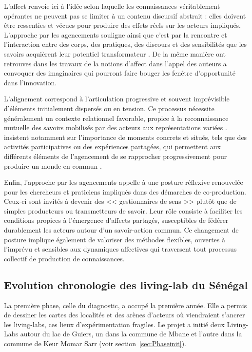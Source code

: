 \documentclass{article}
\begin{document}
L'affect renvoie ici à l'idée selon laquelle les connaissances véritablement opérantes ne peuvent pas se limiter à un contenu discursif abstrait : elles doivent être ressenties et vécues pour produire des effets réels sur les acteurs impliqués. L'approche par les agencements souligne ainsi que c'est par la rencontre et l'interaction entre des corps, des pratiques, des discours et des sensibilités que les savoirs acquièrent leur potentiel transformateur \parencite{bessy_experts_1995}. De la même manière ont retrouves dans les travaux de \textcite{jasanoff_constitutional_2011, beck_governance_2021} la notions d'affect dans l'appel des auteurs a convoquer des imaginaires qui pourront faire bouger les fenêtre d’opportunité dans l'innovation.

L'alignement correspond à l'articulation progressive et souvent imprévisible d'éléments initialement dispersés ou en tension. Ce processus nécessite généralement un contexte relationnel favorable, propice à la reconnaissance mutuelle des savoirs mobilisés par des acteurs aux représentations variées \parencite{geels_typology_2007}. \textcite{jasanoff_constitutional_2011, hertz_knowledge_2025} insistent notamment sur l'importance de moments concrets et situés, tels que des activités participatives ou des expériences partagées, qui permettent aux différents éléments de l'agencement de se rapprocher progressivement pour produire un monde en commun \parencite{arendt_condition_1957}.

Enfin, l'approche par les agencements appelle à une posture réflexive renouvelée pour les chercheurs et praticiens impliqués dans des démarches de co-production. Ceux-ci sont invités à devenir des << gestionnaires de sens >> plutôt que de simples producteurs ou transmetteurs de savoir. Leur rôle consiste à faciliter les conditions propices à l'émergence d'affects partagés, susceptibles de fédérer durablement les acteurs autour d'un savoir-action commun. Ce changement de posture implique également de valoriser des méthodes flexibles, ouvertes à l'imprévu et sensibles aux dynamiques affectives qui traversent tout processus collectif de production de connaissances.

\subsection{Evolution chronologie des living-lab du Sénégal}

La première phase, celle du diagnostic, a occupé la première année. Elle a permis de dessiner les cartes des localités et des arènes d’acteurs où viendraient s’ancrer les living-labs, ces lieux d’expérimentation fragiles. Le projet a initié deux Living-Labs autour du lac de Guiers, un dans la commune de Mbane et l'autre dans la commune de Keur Momar Sarr (voir section~\ref{sec:Phaseinit}). 
\end{document}

